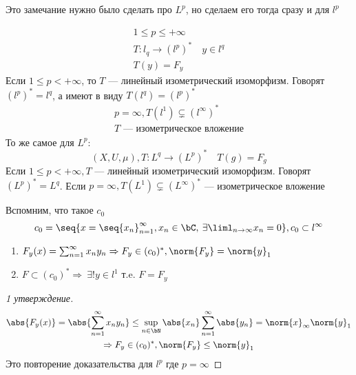 \documentclass[document]{subfiles}
\begin{document}
Это замечание нужно было сделать про $L^p$, но сделаем  его тогда сразу и для $l^p$
\begin{remark}
    \begin{gather*}
        1 \leq p \leq +\infty \\
        T: l_q \rightarrow (l^p)^* \quad y \in l^q \\
        T(y) = F_y
    \end{gather*}
    Если $1 \leq p < + \infty$, то $T$ --- линейный изометрический изоморфизм. Говорят $(l^p)^* = l^q$, а имеют в виду $T(l^q) = (l^p)^*$
    \begin{gather*}
        p = \infty, T(l^1) \subsetneq (l^\infty)^* \\
        T \text{ --- изометрическое вложение}
    \end{gather*}
    То же самое для $L^p$:
        \[ (X, U, \mu), T: L^q \rightarrow (L^p)^* \quad T(g) = F_g \]
        Если $1 \leq p < +\infty, T$ --- линейный изометрический изоморфизм. Говорят $(L^p)^* = L^q$. Если $p = \infty, T(L^1) \subsetneq (L^\infty)^*$ --- 
        изометрическое вложение
\end{remark}

Вспомним, что такое $c_0$
\[ c_0 = \seq{ x = \seq{x_n}^\infty_{n=1}, x_n \in \bC, \: \exists \liml_{n \to \infty} x_n = 0}, c_0 \subset l^\infty \]

\begin{theorem}[сопряжённое к $c_0$]
    \begin{enumerate}
        \item $F_y(x) = \sum^\infty_{n=1} x_n y_n \Rightarrow F_y \in (c_0)^*, \norm{F_y} = \norm{y}_1$
        \item $F \subset (c_0)^* \Rightarrow \: \exists! y \in l^1 \text{ т.e. } F = F_y $
    \end{enumerate}
\end{theorem}

\begin{proof}[1 утверждение]
    \begin{gather*}
        \abs{F_y(x)} = \abs{\sum^\infty_{n=1} x_n y_n} \leq \sup_{n \in \bN} \abs{x_n} \sum^\infty_{n=1} \abs{y_n} = \norm{x}_\infty \norm{y}_1 \\
        \Rightarrow F_y \in (c_0)^*,  \norm{F_y} \leq \norm{y}_1
    \end{gather*}
    Это повторение доказательства для $l^p$ где $p=\infty$
\end{proof}
\end{document}
